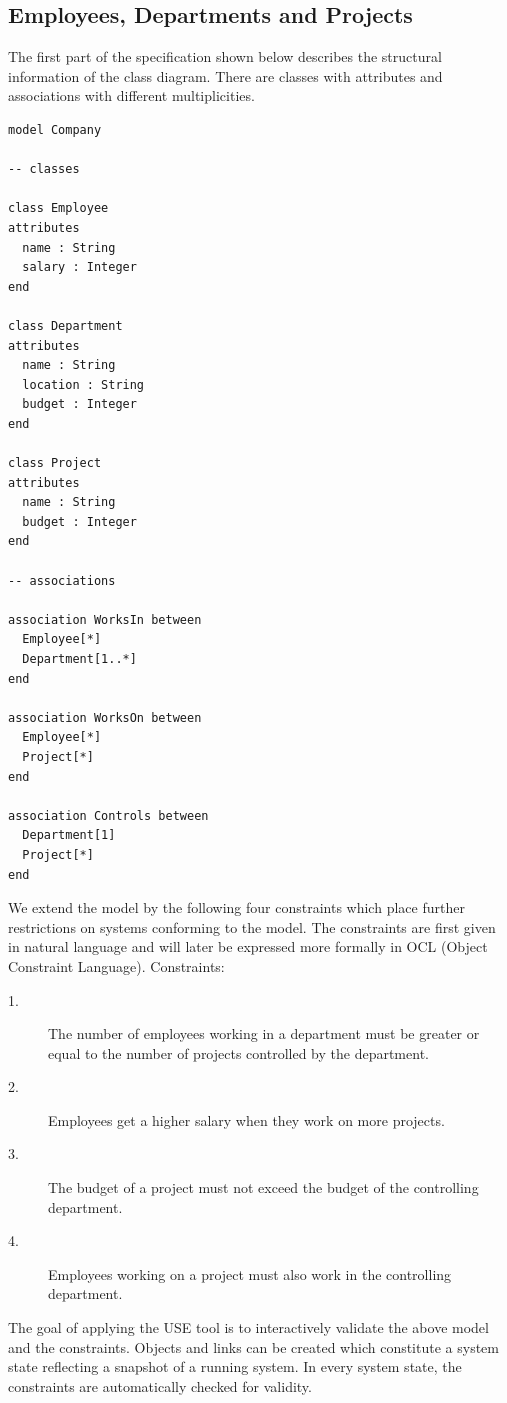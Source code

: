 \documentclass[a4paper,titlepage,oneside,final]{scrreprt} %
\begin{document}
\subsection{Employees, Departments and Projects}\label{EDPspec}
The first part of the specification
shown below describes the structural information of the class diagram.
There are classes with attributes and associations with different multiplicities.
\begin{verbatim}
model Company

-- classes

class Employee
attributes
  name : String
  salary : Integer
end

class Department
attributes
  name : String
  location : String
  budget : Integer
end

class Project
attributes
  name : String
  budget : Integer
end

-- associations

association WorksIn between
  Employee[*]
  Department[1..*]
end

association WorksOn between
  Employee[*]
  Project[*]
end

association Controls between
  Department[1]
  Project[*]
end
\end{verbatim}
We extend the model by the following four constraints which place further restrictions
on systems conforming to the model. The constraints are first given in natural language
and will later be expressed more formally in OCL (Object Constraint Language).
Constraints:
\begin{description}
\item[1.] The number of employees working in a department must be greater or equal
to the number of projects controlled by the department.
\item[2.] Employees get a higher salary when they work on more projects.
\item[3.] The budget of a project must not exceed the budget of the controlling department.
\item[4.] Employees working on a project must also work in the controlling department.
\end{description}
The goal of applying the USE tool is to interactively validate the above model
and the constraints. Objects and links can be created which constitute a system state
reflecting a snapshot of a running system. In every system state,
the constraints are automatically checked for validity.\\\\
\end{document}
